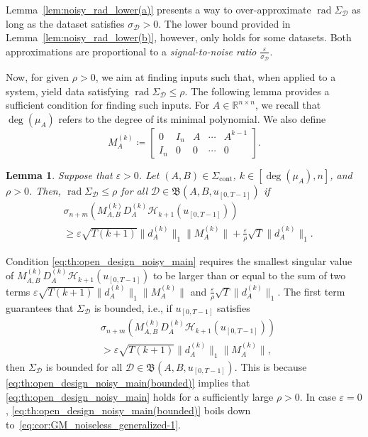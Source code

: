 \documentclass[journal,twoside,web]{ieeecolor}
\DeclareMathOperator{\rad}{rad}
\newtheorem{lemma}[theorem]{Lemma}
\begin{document}
Lemma~\ref{lem:noisy_rad_lower(a)} presents a way to over-approximate $\rad\Sigma_\mathcal{D}$ as long as the dataset satisfies $\sigma_\mathcal{D}>0$. The lower bound provided in Lemma~\ref{lem:noisy_rad_lower(b)}, however, only holds for some datasets. Both approximations are proportional to a \emph{signal-to-noise ratio} $\frac{\varepsilon}{\sigma_\mathcal{D}}$. 

Now, for given $\rho>0$, we aim at finding inputs such that, when applied to a system, yield data satisfying \mbox{$\rad\Sigma_\mathcal{D}\leq \rho$}. The following lemma provides a sufficient condition for finding such inputs. For $A\in\mathbb{R}^{n\times n}$, we recall that $\deg(\mu_A)$ refers to the degree of its minimal polynomial. We also define
\begin{equation}
\label{eq:M_A^k}
M_A^{(k)}\coloneqq \begin{bmatrix}
0 & I_n & A & \cdots & A^{k-1} \\
I_n & 0 & 0 & \cdots & 0
\end{bmatrix}.
\end{equation}

\begin{lemma}
\label{lem:open_design_noisy}
Suppose that $\varepsilon>0$. Let \mbox{$(A,B)\in\Sigma_\text{cont}$}, \mbox{$k\in[\deg(\mu_A),n]$}, and $\rho>0$. Then, $\rad\Sigma_\mathcal{D}\leq \rho$ for all \mbox{$\mathcal{D}\in\mathfrak{B}(A,B,u_{[0,T-1]})$} if 
\begin{equation}
\label{eq:th:open_design_noisy_main}
\begin{split}
&\sigma_{n+m}(M^{(k)}_{A,B}D_{\!A}^{(k)}\mathcal{H}_{k+1}(u_{[0,T-1]}))\\
&\geq\varepsilon\sqrt{T(k+1)}\|d_A^{(k)}\|_1\|M_{A}^{(k)}\|+\frac{\varepsilon}{\rho}\sqrt{T}\|d_A^{(k)}\|_1.
\end{split}
\end{equation}
\end{lemma}

Condition \eqref{eq:th:open_design_noisy_main} requires the smallest singular value of $M^{(k)}_{A,B}D_{\!A}^{(k)}\mathcal{H}_{k+1}(u_{[0,T-1]})$ to be larger than or equal to the sum of two terms $\varepsilon\sqrt{T(k+1)}\|d_A^{(k)}\|_1\|M_{A}^{(k)}\|$ and $\frac{\varepsilon}{\rho}\sqrt{T}\|d_A^{(k)}\|_1$. The first term guarantees that $\Sigma_\mathcal{D}$ is bounded, i.e., if $u_{[0,T-1]}$ satisfies
\begin{equation}
\label{eq:th:open_design_noisy_main(bounded)}
\begin{split}
&\sigma_{n+m}(M^{(k)}_{A,B}D_{\!A}^{(k)}\mathcal{H}_{k+1}(u_{[0,T-1]}))\\
&>\varepsilon\sqrt{T(k+1)}\|d_A^{(k)}\|_1\|M_{A}^{(k)}\|,
\end{split}
\end{equation}
then $\Sigma_\mathcal{D}$ is bounded for all \mbox{$\mathcal{D}\in\mathfrak{B}(A,B,u_{[0,T-1]})$}. This is because \eqref{eq:th:open_design_noisy_main(bounded)} implies that \eqref{eq:th:open_design_noisy_main} holds for a sufficiently large $\rho>0$. In case $\varepsilon=0$, \eqref{eq:th:open_design_noisy_main(bounded)} boils down to~\eqref{eq:cor:GM_noiseless_generalized-1}. 
\end{document}
